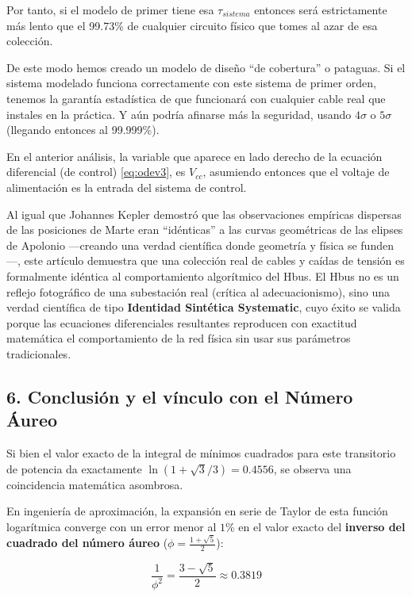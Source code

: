 \documentclass[11pt, a4paper]{article}
\theoremstyle{definition}
\theoremstyle{plain}
\theoremstyle{plain}
\theoremstyle{remark}
\theoremstyle{remark}
\theoremstyle{remark}
\begin{document}
Por tanto, si el modelo de primer tiene esa $\tau_{sistema}$ entonces será estrictamente más lento que el 99.73\% de cualquier circuito físico que tomes al azar de esa colección.

{\color{blue} De este modo hemos creado un modelo de diseño ``de cobertura'' o pataguas. Si el sistema modelado funciona correctamente con este sistema de primer orden, tenemos la garantía estadística de que funcionará con cualquier cable real que instales en la práctica. Y aún podría afinarse más la seguridad, usando $4\sigma$ o $5\sigma$ (llegando entonces al 99.999\%). }

En el anterior análisis, la variable que aparece en lado derecho de la ecuación diferencial (de control) \ref{eq:odev3}, es $V_{cc}$, asumiendo entonces que el voltaje de alimentación es la entrada del sistema de control. 

Al igual que Johannes Kepler demostró que las observaciones empíricas dispersas de las posiciones de Marte eran ``idénticas'' a las curvas geométricas de las elipses de Apolonio —creando una verdad científica donde geometría y física se funden—, este artículo demuestra que una colección real de cables y caídas de tensión es formalmente idéntica al comportamiento algorítmico del Hbus. El Hbus no es un reflejo fotográfico de una subestación real (crítica al adecuacionismo), sino una verdad científica de tipo \textbf{Identidad Sintética Systematic}, cuyo éxito se valida porque las ecuaciones diferenciales resultantes reproducen con exactitud matemática el comportamiento de la red física sin usar sus parámetros tradicionales.


\subsection*{6. Conclusión y el vínculo con el Número Áureo}

Si bien {\color{red} el valor exacto de la integral de mínimos cuadrados para este transitorio de potencia da exactamente $\ln(1 + \sqrt{3}/3) = 0.4556$}, se observa una coincidencia matemática asombrosa. 

En ingeniería de aproximación, la expansión en serie de Taylor de esta función logarítmica converge con un error menor al $1\%$ en el valor exacto del \textbf{inverso del cuadrado del número áureo} ($\phi = \frac{1+\sqrt{5}}{2}$):

\begin{equation}
	\frac{1}{\phi^2} = \frac{3 - \sqrt{5}}{2} \approx \mathbf{0.3819}
\end{equation}
\end{document}
